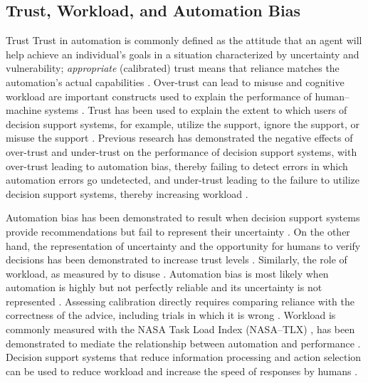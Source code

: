 \documentclass[journal]{IEEEtran}
\theoremstyle{plain}
\theoremstyle{definition}
\providecommand{\DIFaddtex}[1]{{\protect\color{blue} \sf #1}} %
\providecommand{\DIFdeltex}[1]{{\protect\color{red} \scriptsize #1}} %
\providecommand{\DIFaddbegin}{} %
\providecommand{\DIFaddend}{} %
\providecommand{\DIFdelbegin}{} %
\providecommand{\DIFdelend}{} %
\providecommand{\DIFadd}[1]{\texorpdfstring{\DIFaddtex{#1}}{#1}} %
\providecommand{\DIFdel}[1]{\texorpdfstring{\DIFdeltex{#1}}{}} %
\newcommand{\DIFscaledelfig}{0.5}
\newlength{\DIFdelgraphicswidth} %
\newlength{\DIFdelgraphicsheight} %
\newcommand{\DIFaddincludegraphics}[2][]{{\color{blue}\fbox{\DIFOincludegraphics[#1]{#2}}}} %
\newcommand{\DIFdelincludegraphics}[2][]{%
\sbox{\DIFdelgraphicsbox}{\DIFOincludegraphics[#1]{#2}}%
\settoboxwidth{\DIFdelgraphicswidth}{\DIFdelgraphicsbox} %
\settoboxtotalheight{\DIFdelgraphicsheight}{\DIFdelgraphicsbox} %
\scalebox{\DIFscaledelfig}{%
\parbox[b]{\DIFdelgraphicswidth}{\usebox{\DIFdelgraphicsbox}\\[-\baselineskip] \rule{\DIFdelgraphicswidth}{0em}}\llap{\resizebox{\DIFdelgraphicswidth}{\DIFdelgraphicsheight}{%
\setlength{\unitlength}{\DIFdelgraphicswidth}%
\begin{picture}(1,1)%
\thicklines\linethickness{2pt} %
{\color[rgb]{1,0,0}\put(0,0){\framebox(1,1){}}}%
{\color[rgb]{1,0,0}\put(0,0){\line( 1,1){1}}}%
{\color[rgb]{1,0,0}\put(0,1){\line(1,-1){1}}}%
\end{picture}%
}\hspace*{3pt}}} %
} %
\DeclareRobustCommand{\DIFaddbegin}{\DIFOaddbegin \let\includegraphics\DIFaddincludegraphics} %
\DeclareRobustCommand{\DIFaddend}{\DIFOaddend \let\includegraphics\DIFOincludegraphics} %
\DeclareRobustCommand{\DIFdelbegin}{\DIFOdelbegin \let\includegraphics\DIFdelincludegraphics} %
\DeclareRobustCommand{\DIFdelend}{\DIFOaddend \let\includegraphics\DIFOincludegraphics} %
\begin{document}
\DIFdelbegin \subsection{\DIFdel{Trust, Workload, and Automation Bias}}
\addtocounter{subsection}{-1}%
\DIFdel{Trust }\DIFdelend \DIFaddbegin \DIFadd{Trust in automation is commonly defined as the attitude that an agent will help achieve an individual's goals in a situation characterized by uncertainty and vulnerability; \emph{appropriate} (calibrated) trust means that reliance matches the automation's actual capabilities \cite{Lee2004}. Over-trust can lead to misuse }\DIFaddend and \DIFdelbegin \DIFdel{cognitive workload are important constructs used to explain the performance of human--machine systems \cite{Hodgson2013THMS,Bach2024Access}. Trust has been used to explain the extent to which users of decision support systems, for example, utilize the support, ignore the support, or misuse the support \cite{Lai2023FAccT,Yang2022THMSReview}. Previous research has demonstrated the negative effects of over-trust and under-trust on the performance of decision support systems, with over-trust leading to }\DIFdelend automation bias, \DIFdelbegin \DIFdel{thereby failing to detect errors }\DIFdelend \DIFaddbegin \DIFadd{in which automation errors go undetected}\DIFaddend , and under-trust \DIFdelbegin \DIFdel{leading to the failure to utilize decision support systems, thereby increasing workload \cite{Raji2019AIES,Raji2022CACM}. }%

\DIFdel{Automation bias has been demonstrated to result when decision support systems provide recommendations but fail to represent their uncertainty \cite{Raji2019AIES,Weidinger2022FAccT}. On the other hand, the representation of uncertainty and the opportunity for humans to verify decisions has been demonstrated to increase trust levels \cite{Miller2019XRDS,Bach2024Access}. Similarly, the role of workload, as measured by }\DIFdelend \DIFaddbegin \DIFadd{to disuse \cite{Lee2004,Parasuraman2010,Raji2019AIES,Raji2022CACM}. Automation bias is most likely when automation is highly but not perfectly reliable and its uncertainty is not represented \cite{Parasuraman2010,Weidinger2022FAccT}. Assessing calibration directly requires comparing reliance with the correctness of the advice, including trials in which it is wrong \cite{Lee2004,Parasuraman2010}. Workload is commonly measured with }\DIFaddend the NASA Task Load Index (NASA--TLX) \DIFdelbegin \DIFdel{, has been demonstrated to mediate the relationship between automation and performance \cite{Hodgson2013THMS,Yang2022THMSReview}. Decision support systems that reduce information processing and action selection can be used to reduce workload and increase the speed of responses by humans \cite{Lai2023FAccT,Muller2022CHIWORK}}\DIFdelend \DIFaddbegin \DIFadd{\cite{Hart1988}}\DIFaddend .
\end{document}
